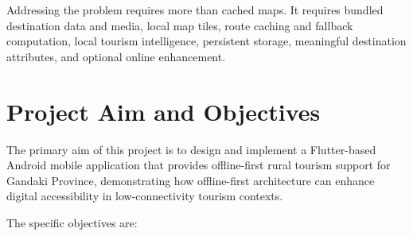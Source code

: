 \documentclass[12pt,a4paper,oneside]{report}
\begin{document}
Addressing the problem requires more than cached maps. It requires bundled destination data and media, local map tiles, route caching and fallback computation, local tourism intelligence, persistent storage, meaningful destination attributes, and optional online enhancement.

\section{Project Aim and Objectives}
\label{sec:objectives}

The primary aim of this project is to design and implement a Flutter-based Android mobile application that provides offline-first rural tourism support for Gandaki Province, demonstrating how offline-first architecture can enhance digital accessibility in low-connectivity tourism contexts.

The specific objectives are:
\end{document}

